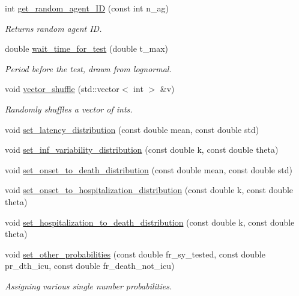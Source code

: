 \begin{DoxyCompactItemize}
int \hyperlink{classInfection_a2e1f72e35d3364f51f37a3dd485153ae}{get\+\_\+random\+\_\+agent\+\_\+\+ID} (const int n\+\_\+ag)
\begin{DoxyCompactList}\small\item\em Returns random agent ID. \end{DoxyCompactList}\item 
double \hyperlink{classInfection_a9047e5efaf7f6582e857d63df5813f8f}{wait\+\_\+time\+\_\+for\+\_\+test} (double t\+\_\+max)
\begin{DoxyCompactList}\small\item\em Period before the test, drawn from lognormal. \end{DoxyCompactList}\item 
void \hyperlink{classInfection_a30cb53ab87d26e8822aa5b8c6f7fc559}{vector\+\_\+shuffle} (std\+::vector$<$ int $>$ \&v)
\begin{DoxyCompactList}\small\item\em Randomly shuffles a vector of ints. \end{DoxyCompactList}\item 
void \hyperlink{classInfection_a005677b5642cfca109812569c0e36e51}{set\+\_\+latency\+\_\+distribution} (const double mean, const double std)
\item 
void \hyperlink{classInfection_acf663b8dd4e7befb65b02221b7bdf037}{set\+\_\+inf\+\_\+variability\+\_\+distribution} (const double k, const double theta)
\item 
void \hyperlink{classInfection_acff99a62401e4d7f5a74502adcd8ae18}{set\+\_\+onset\+\_\+to\+\_\+death\+\_\+distribution} (const double mean, const double std)
\item 
void \hyperlink{classInfection_a06f93f2417379896f598b792e9af83a5}{set\+\_\+onset\+\_\+to\+\_\+hospitalization\+\_\+distribution} (const double k, const double theta)
\item 
void \hyperlink{classInfection_a9550693cb076ce6ccd4335177bbbdbc8}{set\+\_\+hospitalization\+\_\+to\+\_\+death\+\_\+distribution} (const double k, const double theta)
\item 
void \hyperlink{classInfection_a5515c6bbd87c7a3f5d0845e5454aa3fe}{set\+\_\+other\+\_\+probabilities} (const double fr\+\_\+sy\+\_\+tested, const double pr\+\_\+dth\+\_\+icu, const double fr\+\_\+death\+\_\+not\+\_\+icu)
\begin{DoxyCompactList}\small\item\em Assigning various single number probabilities. \end{DoxyCompactList}\item 

\end{DoxyCompactItemize}
